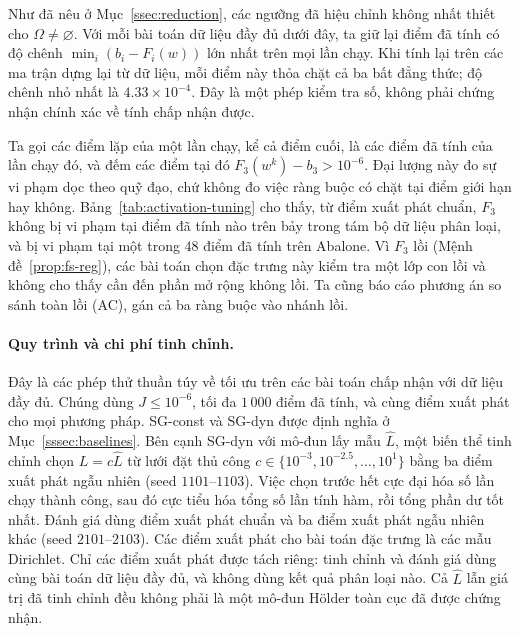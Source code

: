 \documentclass[]{interact}
\theoremstyle{plain}
\theoremstyle{definition}
\theoremstyle{remark}
\begin{document}
Như đã nêu ở Mục~\ref{ssec:reduction}, các ngưỡng đã hiệu chỉnh không nhất thiết cho
$\Omega\ne\varnothing$. Với mỗi bài toán dữ liệu đầy đủ dưới đây, ta giữ lại điểm đã tính có độ chênh
$\min_i(b_i-F_i(w))$ lớn nhất trên mọi lần chạy. Khi tính lại trên các ma trận dựng lại từ dữ liệu, mỗi
điểm này thỏa chặt cả ba bất đẳng thức; độ chênh nhỏ nhất là
$4.33\times10^{-4}$. Đây là một phép kiểm tra số, không phải chứng nhận chính xác về tính chấp nhận được.

Ta gọi các điểm lặp của một lần chạy, kể cả điểm cuối, là các điểm đã tính của lần chạy đó, và đếm các điểm tại đó
$F_3(w^k)-b_3>10^{-6}$. Đại lượng này đo sự vi phạm dọc theo quỹ đạo, chứ không đo việc
ràng buộc có chặt tại điểm giới hạn hay không. Bảng~\ref{tab:activation-tuning} cho thấy, từ
điểm xuất phát chuẩn, $F_3$ không bị vi phạm tại điểm đã tính nào trên bảy trong tám bộ dữ liệu
phân loại, và bị vi phạm tại một trong $48$ điểm đã tính trên Abalone. Vì $F_3$ lồi
(Mệnh đề~\ref{prop:fs-reg}), các bài toán chọn đặc trưng này kiểm tra một lớp con lồi và
không cho thấy cần đến phần mở rộng không lồi. Ta cũng báo cáo phương án so sánh toàn lồi
(AC), gán cả ba ràng buộc vào nhánh lồi.

\paragraph*{Quy trình và chi phí tinh chỉnh.}
Đây là các phép thử thuần túy về tối ưu trên các bài toán chấp nhận với dữ liệu đầy đủ.
Chúng dùng $J\le10^{-6}$, tối đa $1\,000$ điểm đã tính, và cùng
điểm xuất phát cho mọi phương pháp. SG-const và SG-dyn được định nghĩa ở Mục~\ref{sssec:baselines}. Bên cạnh SG-dyn với
mô-đun lấy mẫu $\widehat L$, một biến thể tinh chỉnh chọn $L=c\widehat L$ từ lưới đặt thủ công
$c\in\{10^{-3},10^{-2.5},\ldots,10^1\}$ bằng ba điểm xuất phát
ngẫu nhiên (seed $1101$--$1103$). Việc chọn trước hết cực đại hóa số
lần chạy thành công, sau đó cực tiểu hóa tổng số lần tính hàm, rồi tổng phần dư tốt nhất.
Đánh giá dùng điểm xuất phát chuẩn và ba điểm xuất phát ngẫu nhiên khác
(seed $2101$--$2103$). Các điểm xuất phát cho bài toán đặc trưng là các mẫu Dirichlet.
Chỉ các điểm xuất phát được tách riêng: tinh chỉnh và đánh giá dùng cùng
bài toán dữ liệu đầy đủ, và không dùng kết quả phân loại nào. Cả
$\widehat L$ lẫn giá trị đã tinh chỉnh đều không phải là một mô-đun H\"older toàn cục đã được chứng nhận.
\end{document}
